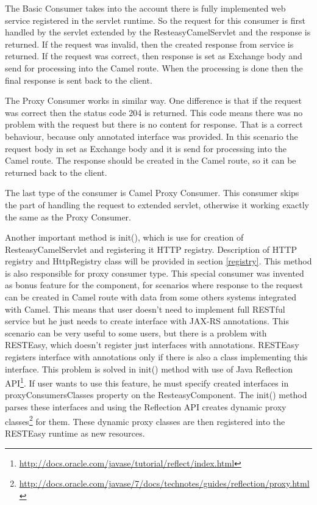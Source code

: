 \documentclass[12pt,final,oneside]{fithesis2}
\begin{document}
The Basic Consumer takes into the account there is fully implemented web service registered in the servlet runtime. So the request for this consumer is first handled by the servlet extended by the ResteasyCamelServlet and the response is returned. If the request was invalid, then the created response from service is returned. If the request was correct, then response is set as Exchange body and send for processing into the Camel route. When the processing is done then the final response is sent back to the client. 

The Proxy Consumer works in similar way. One difference is that if the request was correct then the status code 204 is returned. This code means there was no problem with the request but there is no content for response\cite{http}. That is a correct behaviour, because only annotated interface was provided. In this scenario the request body in set as Exchange body and it is send for processing into the Camel route. The response should be created in the Camel route, so it can be returned back to the client.

The last type of the consumer is Camel Proxy Consumer. This consumer skips the part of handling the request to extended servlet, otherwise it working exactly the same as the Proxy Consumer.     

Another important method is init(), which is use for creation of ResteasyCamelServlet and registering it HTTP registry. Description of HTTP registry and HttpRegistry class will be provided in section \ref{registry}. This method is also responsible for proxy consumer type. This special consumer was invented as bonus feature for the component, for scenarios where response to the request can be created in Camel route with data from some others systems integrated with Camel. This means that user doesn't need to implement full RESTful service but he just needs to create interface with JAX-RS annotations. This scenario can be very useful to some users, but there is a problem with RESTEasy, which  doesn't register just interfaces with annotations. RESTEasy registers interface with annotations only if there is also a class implementing this interface. This problem is solved in init() method with use of Java Reflection API\footnote{\url{http://docs.oracle.com/javase/tutorial/reflect/index.html}}. If user wants to use this feature, he must specify created interfaces in proxyConsumersClasses property on the ResteasyComponent. The init() method parses these interfaces and using the Reflection API creates dynamic proxy classes\footnote{\url{http://docs.oracle.com/javase/7/docs/technotes/guides/reflection/proxy.html}} for them. These dynamic proxy classes are then registered into the RESTEasy runtime as new resources.
\end{document}
